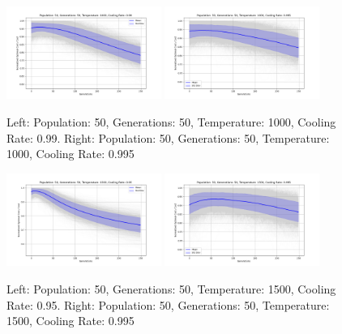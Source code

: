 \documentclass{article}
\begin{document}
    \begin{figure}[H]
        \centering
        \includegraphics[width=0.45\textwidth]{genetic_simulated_annealing_hybrid/appendix/Population_50_Generations_50_Temperature_1000_CoolingRate_0.99.png}
        \includegraphics[width=0.45\textwidth]{genetic_simulated_annealing_hybrid/appendix/Population_50_Generations_50_Temperature_1000_CoolingRate_0.995.png}
        \caption{Left: Population: 50, Generations: 50, Temperature: 1000, Cooling Rate: 0.99. Right: Population: 50, Generations: 50, Temperature: 1000, Cooling Rate: 0.995}
        \label{fig:app_ga_50_50_1000_99_995}
    \end{figure}

    \begin{figure}[H]
        \centering
        \includegraphics[width=0.45\textwidth]{genetic_simulated_annealing_hybrid/appendix/Population_50_Generations_50_Temperature_1500_CoolingRate_0.95.png}
        \includegraphics[width=0.45\textwidth]{genetic_simulated_annealing_hybrid/appendix/Population_50_Generations_50_Temperature_1500_CoolingRate_0.995.png}
        \caption{Left: Population: 50, Generations: 50, Temperature: 1500, Cooling Rate: 0.95. Right: Population: 50, Generations: 50, Temperature: 1500, Cooling Rate: 0.995}
        \label{fig:app_ga_50_50_1500_95_995}
    \end{figure}
\end{document}
